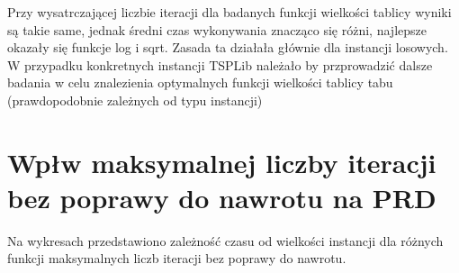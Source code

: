 \documentclass{article}
\begin{document}
  Przy wysatrczającej liczbie iteracji dla badanych funkcji wielkości tablicy wyniki są takie same, 
  jednak średni czas wykonywania znacząco się różni, najlepsze okazały się funkcje log i sqrt. Zasada ta działała
  głównie dla instancji losowych. W przypadku konkretnych instancji TSPLib należało by przprowadzić dalsze
  badania w celu znalezienia optymalnych funkcji wielkości tablicy tabu (prawdopodobnie zależnych od typu instancji)


\section{Wpłw maksymalnej liczby iteracji bez poprawy do nawrotu na PRD}

Na wykresach przedstawiono zależność czasu od wielkości instancji dla różnych funkcji maksymalnych liczb iteracji bez poprawy do nawrotu.
\end{document}
